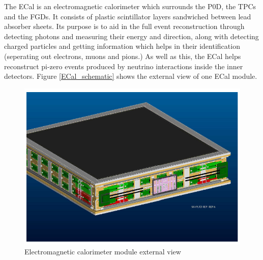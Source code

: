 The ECal is an electromagnetic calorimeter which surrounds the P0D, the TPCs and the FGDs. It consists of plastic scintillator layers sandwiched between lead absorber sheets. Its purpose is to aid in the full event reconstruction through detecting photons and measuring their energy and direction, along with detecting charged particles and getting information which helps in their identification (seperating out electrons, muons and pions.) As well as this, the ECal helps reconstruct pi-zero events produced by neutrino interactions inside the inner detectors. Figure \ref{ECal_schematic} shows the external view of one ECal module.

\begin{figure}
    \includegraphics[width=\textwidth]{Figures/ECal_schematic.png}
    \caption{Electromagnetic calorimeter module external view}
\label{fig:ECal_schematic}
\end{figure}

